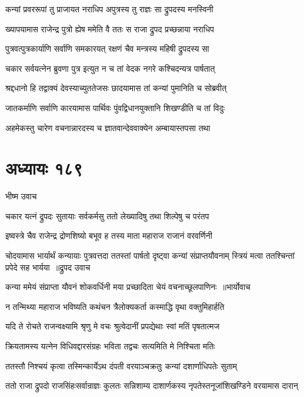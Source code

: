 \twolineshloka
{कन्यां प्रवररूपां तु प्राजायत नराधिप}
{अपुत्रस्य तु राज्ञः सा द्रुपदस्य मनस्विनी}


\twolineshloka
{ख्यापयामास राजेन्द्र पुत्रो ह्येष ममेति वै}
{ततः स राजा द्रुपद प्रच्छन्नाया नराधिप}


\twolineshloka
{पुत्रवत्पुत्रकार्याणि सर्वाणि समकारयत्}
{रक्षणं चैव मन्त्रस्य महिषी द्रुपदस्य सा}


\twolineshloka
{चकार सर्वयत्नेन ब्रुवणा पुत्र इत्युत}
{न च तां वेदक नगरे कश्चिदन्यत्र पार्षतात्}


\twolineshloka
{श्रद्दधानो हि तद्वाक्यं देवस्याच्युततेजसः}
{छादयामास तां कन्यां पुमानिति च सोब्रवीत्}


\twolineshloka
{जातकर्माणि सर्वाणि कारयामास पार्थिवः}
{पुंवद्विधानयुक्तानि शिखण्डीति च तां विदुः}


\twolineshloka
{अहमेकस्तु चारेण वचनान्नारदस्य च}
{ज्ञातवान्देववाक्येन अम्बायास्तपसा तथा}


\chapter{अध्यायः १८९}
\twolineshloka
{भीष्म उवाच}
{}


\twolineshloka
{चकार यत्नं द्रुपदः सुतायाः सर्वकर्मसु}
{ततो लेख्यादिषु तथा शिल्पेषु च परंतप}


\twolineshloka
{इष्वस्त्रे चैव राजेन्द्र द्रोणशिष्यो बभूव ह}
{तस्य माता महाराज राजानं वरवर्णिनी}


\fourlineindentedshloka
{चोदयामास भार्यार्थं कन्यायाः पुत्रवत्तदा}
{ततस्तां पार्षतो दृष्ट्वा कन्यां संप्राप्तयौवनाम्}
{स्त्रियं मत्वा ततश्चिन्तां प्रपेदे सह भार्यया ॥द्रुपद उवाच}
{}


\threelineshloka
{कन्या ममेयं संप्राप्ता यौवनं शोकवर्धिनी}
{मया प्रच्छादिता चेयं वचनाच्छूलपाणिनः ॥भार्योवाच}
{}


\twolineshloka
{न तन्मिथ्या महाराज भविष्यति कथंचन}
{त्रैलोक्यकर्ता कस्माद्धि वृथा वक्तुमिहार्हति}


\twolineshloka
{यदि ते रोचते राजन्वक्ष्यामि श्रृणु मे वचः}
{श्रुत्वेदानीं प्रपद्येथाः स्वां मतिं पृषतात्मज}


\twolineshloka
{क्रियतामस्य यत्नेन विधिवद्दारसंग्रहः}
{भविता तद्वचः सत्यमिति मे निश्चिता मतिः}


\twolineshloka
{ततस्तौ निश्चयं कृत्वा तस्मिन्कार्येऽथ दंपती}
{वरयाञ्चक्रतुः कन्यां दशार्णाधिपतेः सुताम्}


\twolineshloka
{ततो राजा द्रुपदो राजसिंहःसर्वान्राज्ञः कुलतः सन्निशाम्य}
{दाशार्णकस्य नृपतेस्तनूजांशिखण्डिने वरयामास दारान्}


